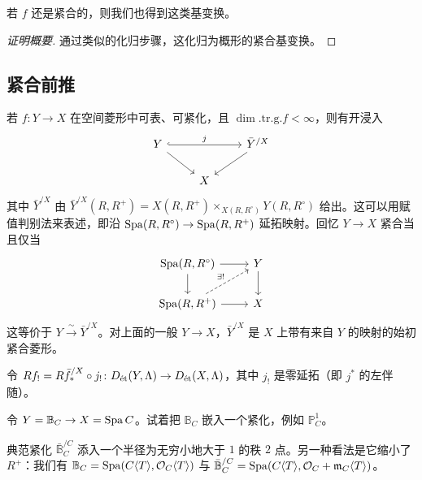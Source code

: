 \begin{theorem}[紧合基变换]
若 $f$ 还是紧合的，则我们也得到这类基变换。
\end{theorem}

\begin{proof}[证明概要]
通过类似的化归步骤，这化归为概形的紧合基变换。
\end{proof}


\subsection{紧合前推}

若 $f\colon Y\to X$ 在空间菱形中可表、可紧化，且 $\dim.\mathrm{tr.g.}f<\infty$，则有开浸入
\[
\begin{tikzcd}
Y \arrow[rr, hook, "j"] \arrow[dr] & & \bar Y^{/X} \arrow[dl] \\
& X &
\end{tikzcd}
\]
其中 $\bar Y^{/X}$ 由 $\bar Y^{/X}(R,R^+)=X(R,R^+)\times_{X(R,R^\circ)}Y(R,R^\circ)$ 给出。这可以用赋值判别法来表述，即沿 $\Spa(R,R^\circ)\to\Spa(R,R^+)$ 延拓映射。回忆 $Y\to X$ 紧合当且仅当
\[
\begin{tikzcd}
\Spa(R,R^\circ) \arrow[r] \arrow[d] & Y \arrow[d] \\
\Spa(R,R^+) \arrow[r] \arrow[ur, dashed, "\exists!"] & X
\end{tikzcd}
\]
这等价于 $Y\xrightarrow{\ \sim\ }\bar Y^{/X}$。对上面的一般 $Y\to X$，$\bar Y^{/X}$ 是 $X$ 上带有来自 $Y$ 的映射的始初紧合菱形。

\begin{definition}
令 $Rf_!=R\bar f^{/X}_*\circ j_!\colon D_{\et}(Y,\Lambda)\to D_{\et}(X,\Lambda)$，其中 $j_!$ 是零延拓（即 $j^*$ 的左伴随）。
\end{definition}

\begin{example}
令 $Y=\mathbb{B}_C\to X=\Spa C$。试着把 $\mathbb{B}_C$ 嵌入一个紧化，例如 $\mathbb{P}^1_C$。
\end{example}

\begin{center}
\end{center}

典范紧化 $\bar{\mathbb{B}}^{/C}_C$ 添入一个半径为无穷小地大于 $1$ 的秩 $2$ 点。另一种看法是它缩小了 $R^+$：我们有 $\mathbb{B}_C=\Spa(C\langle T\rangle,\cO_C\langle T\rangle)$ 与 $\bar{\mathbb{B}}^{/C}_C=\Spa(C\langle T\rangle,\cO_C+\mathfrak{m}_C\langle T\rangle)$。

